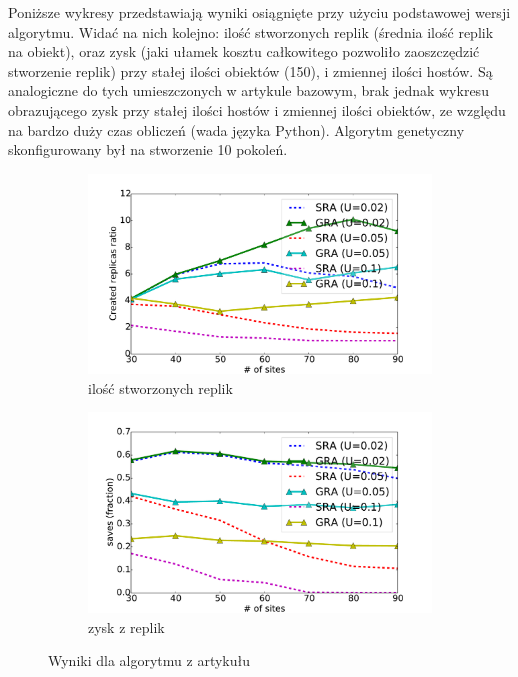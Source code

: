 \documentclass[11pt,pdftex,a4paper]{scrartcl}
\begin{document}
Poniższe wykresy przedstawiają wyniki osiągnięte przy użyciu podstawowej wersji algorytmu.
Widać na nich kolejno: ilość stworzonych replik (średnia ilość replik na obiekt), oraz zysk (jaki 
ułamek kosztu całkowitego pozwoliło zaoszczędzić stworzenie replik) przy stałej ilości obiektów (150),
i zmiennej ilości hostów. Są analogiczne do tych umieszczonych w artykule bazowym, brak jednak wykresu
obrazującego zysk przy stałej ilości hostów i zmiennej ilości obiektów, ze względu na bardzo duży czas
obliczeń (wada języka Python). Algorytm genetyczny skonfigurowany był na stworzenie 10 pokoleń.

\begin{figure}[H]
    \centering
    \begin{subfigure}[b]{0.49\textwidth} 
        \includegraphics[width=\textwidth]{plots/replicas}
        \caption{ilość stworzonych replik}
    \end{subfigure}
    \begin{subfigure}[b]{0.49\textwidth}
        \includegraphics[width=\textwidth]{plots/saves}
        \caption{zysk z replik}
    \end{subfigure}

    \caption{Wyniki dla algorytmu z artykułu}
    \label{plot:original}
\end{figure}
\end{document}
